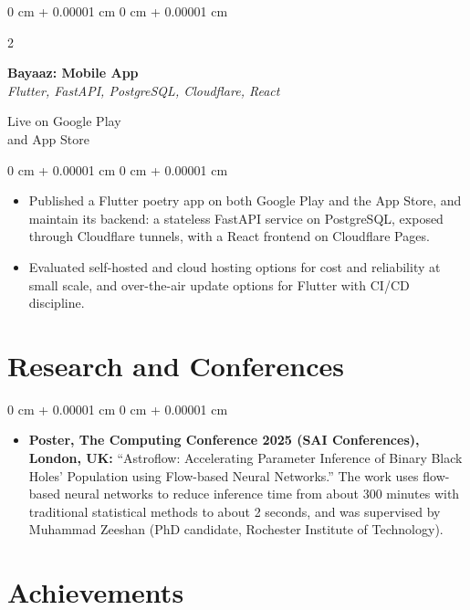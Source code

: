 \documentclass[10pt, letterpaper]{article}
\newenvironment{highlights}{
    \begin{itemize}[
        topsep=0.10 cm,
        parsep=0.10 cm,
        partopsep=0pt,
        itemsep=0pt,
        leftmargin=0 cm + 10pt
    ]
}{
    \end{itemize}
} %
\newenvironment{onecolentry}{
    \begin{adjustwidth}{
        0 cm + 0.00001 cm
    }{
        0 cm + 0.00001 cm
    }
}{
    \end{adjustwidth}
} %
\newenvironment{twocolentry}[2][]{
    \onecolentry
    \def\secondColumn{#2}
    \setcolumnwidth{\fill, 4.5 cm}
    \begin{paracol}{2}
}{
    \switchcolumn \raggedleft \secondColumn
    \end{paracol}
    \endonecolentry
} %
\begin{document}
\vspace{0.2 cm}

\begin{twocolentry}{Live on Google Play \\ and App Store}
    \textbf{Bayaaz: Mobile App} \\
    \textit{Flutter, FastAPI, PostgreSQL, Cloudflare, React}
\end{twocolentry}
\begin{onecolentry}
    \begin{highlights}
        \item Published a Flutter poetry app on both Google Play and the App Store, and maintain its backend: a stateless FastAPI service on PostgreSQL, exposed through Cloudflare tunnels, with a React frontend on Cloudflare Pages.
        \item Evaluated self-hosted and cloud hosting options for cost and reliability at small scale, and over-the-air update options for Flutter with CI/CD discipline.
    \end{highlights}
\end{onecolentry}


\section{Research and Conferences}
\begin{onecolentry}
    \begin{highlights}
        \item \textbf{Poster, The Computing Conference 2025 (SAI Conferences), London, UK:} ``Astroflow: Accelerating Parameter Inference of Binary Black Holes' Population using Flow-based Neural Networks.'' The work uses flow-based neural networks to reduce inference time from about 300 minutes with traditional statistical methods to about 2 seconds, and was supervised by Muhammad Zeeshan (PhD candidate, Rochester Institute of Technology).
    \end{highlights}
\end{onecolentry}

\section{Achievements}
\end{document}
